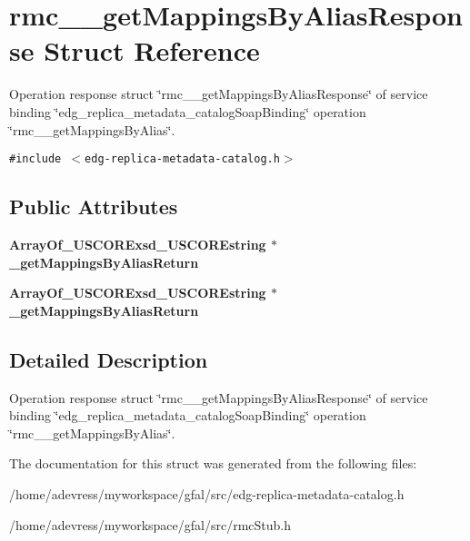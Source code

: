 \section{rmc\_\-\_\-get\-Mappings\-By\-Alias\-Response Struct Reference}
\label{structrmc____getMappingsByAliasResponse}
Operation response struct \char`\"{}rmc\_\-\_\-get\-Mappings\-By\-Alias\-Response\char`\"{} of service binding \char`\"{}edg\_\-replica\_\-metadata\_\-catalog\-Soap\-Binding\char`\"{} operation \char`\"{}rmc\_\-\_\-get\-Mappings\-By\-Alias\char`\"{}.  


{\tt \#include $<$edg-replica-metadata-catalog.h$>$}

\subsection*{Public Attributes}
\begin{CompactItemize}
\item 
\bf{Array\-Of\_\-USCORExsd\_\-USCOREstring} $\ast$ \textbf{\_\-get\-Mappings\-By\-Alias\-Return}\label{structrmc____getMappingsByAliasResponse_6f5cfa14c4e40670a2801ccd785e0435}

\item 
\bf{Array\-Of\_\-USCORExsd\_\-USCOREstring} $\ast$ \textbf{\_\-get\-Mappings\-By\-Alias\-Return}\label{structrmc____getMappingsByAliasResponse_6f5cfa14c4e40670a2801ccd785e0435}

\end{CompactItemize}


\subsection{Detailed Description}
Operation response struct \char`\"{}rmc\_\-\_\-get\-Mappings\-By\-Alias\-Response\char`\"{} of service binding \char`\"{}edg\_\-replica\_\-metadata\_\-catalog\-Soap\-Binding\char`\"{} operation \char`\"{}rmc\_\-\_\-get\-Mappings\-By\-Alias\char`\"{}. 



The documentation for this struct was generated from the following files:\begin{CompactItemize}
\item 
/home/adevress/myworkspace/gfal/src/edg-replica-metadata-catalog.h\item 
/home/adevress/myworkspace/gfal/src/rmc\-Stub.h\end{CompactItemize}
